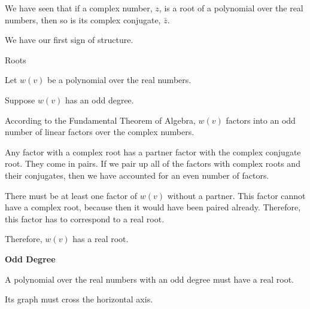 \documentclass{ximera}
\begin{document}
We have seen that if a complex number, $z$, is a root of a polynomial over the real numbers, then so is its complex conjugate, $\bar{z}$.

We have our first sign of structure.




\begin{example} Roots

Let $w(v)$ be a polynomial over the real numbers.

Suppose $w(v)$ has an odd degree.


According to the Fundamental Theorem of Algebra, $w(v)$ factors into an odd number of linear factors over the complex numbers.

Any factor with a complex root has a partner factor with the complex conjugate root.  They come in pairs.  If we pair up all of the factors with complex roots and their conjugates, then we have accounted for an even number of factors.  

There must be at least one factor of $w(v)$ without a partner.  This factor cannot have a complex root, because then it would have been paired already.  Therefore, this factor has to correspond to a real root.

Therefore, $w(v)$ has a real root.




\end{example}








\begin{theorem} \textbf{\textcolor{-red!75!green}{Odd Degree}} 

A polynomial over the real numbers with an odd degree must have a real root.

Its graph must cross the horizontal axis.

\end{theorem}
\end{document}
